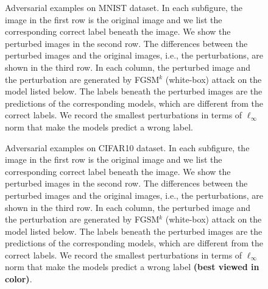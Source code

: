 \documentclass[11pt]{article}
\newcommand{\0}{\mathbf{0}}
\newcommand{\1}{\mathbf{1}}
\begin{document}
\begin{figure}
	\centering
	\quad
	\quad
	\quad
	\caption{Adversarial examples on MNIST dataset. In each subfigure, the image in the first row is the original image and we list the corresponding correct label beneath the image. We show the perturbed images in the second row. The differences between the perturbed images and the original images, i.e., the perturbations, are shown in the third row. In each column, the perturbed image and the perturbation are generated by FGSM$^{k}$ (white-box) attack on the model listed below. The labels beneath the perturbed images are the predictions of the corresponding models, which are different from the correct labels. We record the smallest perturbations in terms of $\ell_\infty$ norm that make the models predict a wrong label.}
	\label{figure: MNIST-adv-images}
\end{figure}



\begin{figure}[htbp]
	\centering
	\quad
	\quad
	\quad
	\caption{Adversarial examples on CIFAR10 dataset. In each subfigure, the image in the first row is the original image and we list the corresponding correct label beneath the image. We show the perturbed images in the second row. The differences between the perturbed images and the original images, i.e., the perturbations, are shown in the third row. In each column, the perturbed image and the perturbation are generated by FGSM$^{k}$ (white-box) attack on the model listed below. The labels beneath the perturbed images are the predictions of the corresponding models, which are different from the correct labels. We record the smallest perturbations in terms of $\ell_\infty$ norm that make the models predict a wrong label \textbf{(best viewed in color)}.}
	\label{figure: CIFAR10-adv-images}
\end{figure}
\end{document}
